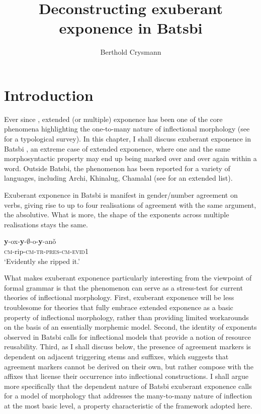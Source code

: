 \documentclass[output=paper]{langsci/langscibook}
\author{Berthold Crysmann\affiliation{Université de Paris, Laboratoire de linguistique formelle, CNRS}}
\title{Deconstructing exuberant exponence in Batsbi}
\begin{document}
\maketitle


\section{Introduction}

Ever since \citet{Matthews72}, extended (or multiple) exponence has
been one of the core phenomena highlighting the one-to-many nature of
inflectional morphology (see \citealt{Harris17} for a typological
survey). In this chapter, I shall discuss exuberant exponence in
Batsbi \citep{Harris09}, an extreme case of extended exponence, where
one and the same morphosyntactic property may end up being marked over
and over again within a word. Outside Batsbi, the phenomenon has been
reported for a variety of languages, including Archi, Khinalug,
Chamalal (see \citealp{Harris09} for an extended list).


Exuberant exponence in Batsbi is manifest in gender/number agreement
on verbs, giving rise to up to four realisations of agreement with the
same argument, the absolutive. What is more, the shape of the
exponents across multiple realisations stays the same.

\begin{exe}
  \ex  \label{ex:Batsbi}\gll \textbf{y}-ox-\textbf{y}-$\emptyset$-o-\textbf{y}-anǒ\\
  \textsc{cm}-rip-\textsc{cm-tr-pres-cm-evid1}\\
  \glt `Evidently she ripped it.’ \hfill\citep[277]{Harris09}
  
\end{exe}

What makes exuberant exponence particularly interesting from the
viewpoint of formal grammar is that the phenomenon can serve as a
stress-test for current theories of inflectional morphology. First,
exuberant exponence will be less troublesome for theories that fully
embrace extended exponence as a basic property of inflectional
morphology, rather than providing limited workarounds on the basis of
an essentially morphemic model. Second, the identity of exponents
observed in Batsbi calls for inflectional models that provide a notion
of resource reusability. Third, as I shall discuss below, the
presence of agreement markers is dependent on adjacent triggering
stems and suffixes, which suggests that agreement markers cannot be
derived on their own, but rather compose with the affixes that license
their occurrence into inflectional constructions. I shall argue more
specifically that the dependent nature of Batsbi exuberant exponence
calls for a model of morphology that addresses the many-to-many nature
of inflection at the most basic level, a property characteristic of
the framework adopted here.
 
\end{document}
